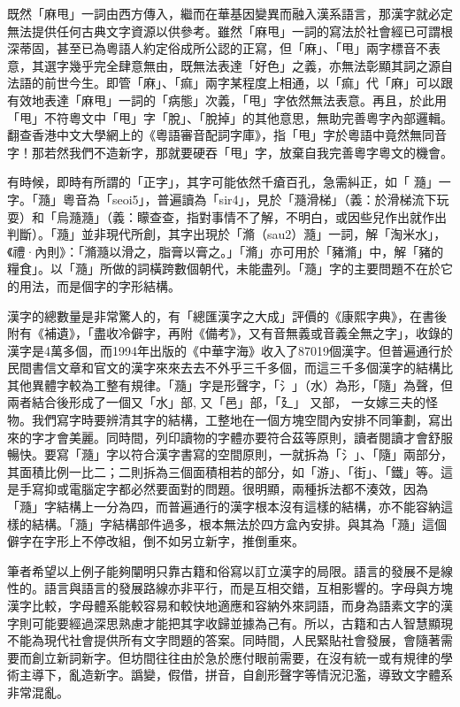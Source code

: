 既然「麻甩」一詞由西方傳入，繼而在華基因變異而融入漢系語言，那漢字就必定無法提供任何古典文字資源以供參考。雖然「麻甩」一詞的寫法於社會經已可謂根深蒂固，甚至已為粵語人約定俗成所公認的正寫，但「麻」、「甩」兩字標音不表意，其選字幾乎完全肆意無由，既無法表達「好色」之義，亦無法彰顯其詞之源自法語的前世今生。即管「麻」、「痲」兩字某程度上相通，以「痲」代「麻」可以跟有效地表達「麻甩」一詞的「病態」次義，「甩」字依然無法表意。再且，於此用「甩」不符粵文中「甩」字「脫」、「脫掉」的其他意思，無助完善粵字內部邏輯。翻查香港中文大學網上的《粵語審音配詞字庫》，指「甩」字於粵語中竟然無同音字！那若然我們不造新字，那就要硬吞「甩」字，放棄自我完善粵字粵文的機會。

有時候，即時有所謂的「正字」，其字可能依然千瘡百孔，急需糾正，如「 瀡」一字。「瀡」粵音為「seoi5」，普遍讀為「sir4」，見於「瀡滑梯」（義：於滑梯流下玩耍）和「烏瀡瀡」（義：矇查查，指對事情不了解，不明白，或因些兒作出就作出判斷）。「瀡」並非現代所創，其字出現於「滫（sau2）瀡」一詞，解「淘米水」，《禮·內則》：「滫瀡以滑之，脂膏以膏之。」「滫」亦可用於「豬滫」中，解「豬的糧食」。以「瀡」所做的詞橫跨數個朝代，未能盡列。「瀡」字的主要問題不在於它的用法，而是個字的字形結構。

漢字的總數量是非常驚人的，有「總匯漢字之大成」評價的《康熙字典》，在書後附有《補遺》，「盡收冷僻字，再附《備考》，又有音無義或音義全無之字」，收錄的漢字是4萬多個，而1994年出版的《中華字海》收入了87019個漢字。但普遍通行於民間書信文章和官文的漢字來來去去不外乎三千多個，而這三千多個漢字的結構比其他異體字較為工整有規律。「瀡」字是形聲字，「氵」（水）為形，「隨」為聲，但兩者結合後形成了一個又「水」部, 又「邑」部，「廴」 又部， 一女嫁三夫的怪物。我們寫字時要辨清其字的結構，工整地在一個方塊空間內安排不同筆劃，寫出來的字才會美麗。同時間，列印讀物的字體亦要符合茲等原則，讀者閱讀才會舒服暢快。要寫「瀡」字以符合漢字書寫的空間原則，一就拆為「氵」、「隨」兩部分，其面積比例一比二；二則拆為三個面積相若的部分，如「游」、「街」、「鐵」等。這是手寫抑或電腦定字都必然要面對的問題。很明顯，兩種拆法都不湊效，因為「瀡」字結構上一分為四，而普遍通行的漢字根本沒有這樣的結構，亦不能容納這樣的結構。「瀡」字結構部件過多，根本無法於四方盒內安排。與其為「瀡」這個僻字在字形上不停改組，倒不如另立新字，推倒重來。

筆者希望以上例子能夠闡明只靠古籍和俗寫以訂立漢字的局限。語言的發展不是線性的。語言與語言的發展路線亦非平行，而是互相交錯，互相影響的。字母與方塊漢字比較，字母體系能較容易和較快地適應和容納外來詞語，而身為語素文字的漢字則可能要經過深思熟慮才能把其字收歸並據為己有。所以，古籍和古人智慧顯現不能為現代社會提供所有文字問題的答案。同時間，人民緊貼社會發展，會隨著需要而創立新詞新字。但坊間往往由於急於應付眼前需要，在沒有統一或有規律的學術主導下，亂造新字。譌變，假借，拼音，自創形聲字等情況氾濫，導致文字體系非常混亂。

